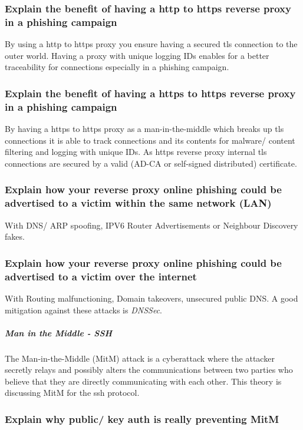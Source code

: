 \subsubsection{Explain the benefit of having a http to https reverse proxy in a phishing campaign}
By using a http to https proxy you ensure having a secured tls connection to the outer world. Having a proxy with unique logging IDs enables for a better traceability for connections especially in a phishing campaign.

\subsubsection{Explain the benefit of having a https to https reverse proxy in a phishing campaign}
By having a https to https proxy as a man-in-the-middle which breaks up tls connections it is able to track connections and its contents for malware/ content filtering and logging with unique IDs. As https reverse proxy internal tls connections are secured by a valid (AD-CA or self-signed distributed) certificate.

\subsubsection{Explain how your reverse proxy online phishing could be advertised to a victim within the same network (LAN)}
With DNS/ ARP spoofing, IPV6 Router Advertisements or Neighbour Discovery fakes.

\subsubsection{Explain how your reverse proxy online phishing could be advertised to a victim over the internet}
With Routing malfunctioning, Domain takeovers, unsecured public DNS. A good mitigation against these attacks is \textit{DNSSec}.

\subparagraph{Man in the Middle - SSH}
The Man-in-the-Middle (MitM) attack is a cyberattack where the attacker secretly relays and possibly alters the communications between two parties who believe that they are directly communicating with each other. This theory is discussing MitM for the ssh protocol.

\subsubsection{Explain why public/ key auth is really preventing MitM}

